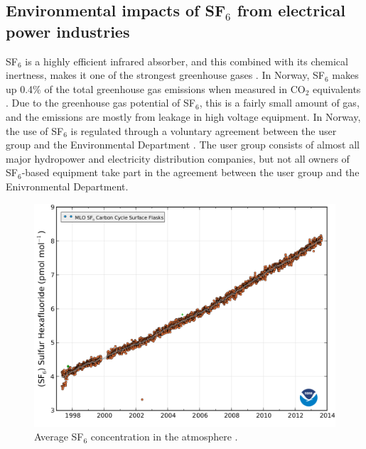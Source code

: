 \documentclass[10pt,a4paper,twoside]{article}
\begin{document}
\newpage
\subsection{Environmental impacts of SF$_6$ from electrical power industries} \label{sec:EnvirImp}

SF$_6$ is a highly efficient infrared absorber, and this combined with its chemical inertness, makes it one of the strongest greenhouse gases \cite{bib:SF6PI}. In Norway, SF$_6$ makes up 0.4\% of the total greenhouse gas emissions when measured in CO$_2$ equivalents \cite{bib:KlimaKur2020}. Due to the greenhouse gas potential of SF$_6$, this is a fairly small amount of gas, and the emissions are mostly from leakage in high voltage equipment. In Norway, the use of SF$_6$ is regulated through a voluntary agreement between the user group and the Environmental Department \cite{bib:KlimaKur2020}. The user group consists of almost all major hydropower and electricity distribution companies, but not all owners of SF$_6$-based equipment take part in the agreement between the user group and the Enivronmental Department.

\begin{figure}[H]
\centering
\includegraphics[scale=0.4]{Bilder/Theory/consentrationSF6.png}
\caption{Average SF$_6$ concentration in the atmosphere \cite{bib:consSF6}.} \label{fig:conSF6}
\end{figure}
\end{document}
